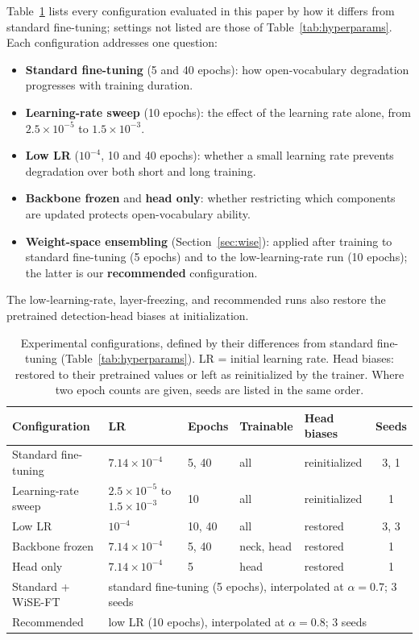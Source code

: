 \documentclass[conf]{new-aiaa}
\begin{document}
Table~\ref{tab:configs} lists every configuration evaluated in this paper by how it differs
from standard fine-tuning; settings not listed are those of Table~\ref{tab:hyperparams}. Each
configuration addresses one question:
\begin{itemize}
    \item \textbf{Standard fine-tuning} (5 and 40 epochs): how open-vocabulary degradation
          progresses with training duration.
    \item \textbf{Learning-rate sweep} (10 epochs): the effect of the learning rate alone, from
          $2.5\times10^{-5}$ to $1.5\times10^{-3}$.
    \item \textbf{Low LR} ($10^{-4}$, 10 and 40 epochs): whether a small learning rate prevents
          degradation over both short and long training.
    \item \textbf{Backbone frozen} and \textbf{head only}: whether restricting which components
          are updated protects open-vocabulary ability.
    \item \textbf{Weight-space ensembling} (Section~\ref{sec:wise}): applied after training to
          standard fine-tuning (5 epochs) and to the low-learning-rate run (10 epochs); the
          latter is our \textbf{recommended} configuration.
\end{itemize}
The low-learning-rate, layer-freezing, and recommended runs also restore the pretrained
detection-head biases at initialization.

\begin{table}[hbt!]
\caption{Experimental configurations, defined by their differences from standard fine-tuning
         (Table~\ref{tab:hyperparams}). LR = initial learning rate. Head biases: restored to
         their pretrained values or left as reinitialized by the trainer. Where two epoch counts
         are given, seeds are listed in the same order.}
\label{tab:configs}
\centering
\begin{tabular}{lllllc}
\hline
\textbf{Configuration} & \textbf{LR} & \textbf{Epochs} & \textbf{Trainable} & \textbf{Head biases} & \textbf{Seeds} \\
\hline
Standard fine-tuning        & $7.14\times10^{-4}$ & 5, 40 & all & reinitialized & 3, 1 \\
Learning-rate sweep         & $2.5\times10^{-5}$ to $1.5\times10^{-3}$ & 10 & all & reinitialized & 1 \\
Low LR                      & $10^{-4}$ & 10, 40 & all & restored & 3, 3 \\
Backbone frozen             & $7.14\times10^{-4}$ & 5, 40 & neck, head & restored & 1 \\
Head only                   & $7.14\times10^{-4}$ & 5 & head & restored & 1 \\
Standard + WiSE-FT          & \multicolumn{5}{l}{standard fine-tuning (5 epochs), interpolated at $\alpha = 0.7$; 3 seeds} \\
Recommended                 & \multicolumn{5}{l}{low LR (10 epochs), interpolated at $\alpha = 0.8$; 3 seeds} \\
\hline
\end{tabular}
\end{table}
\end{document}
